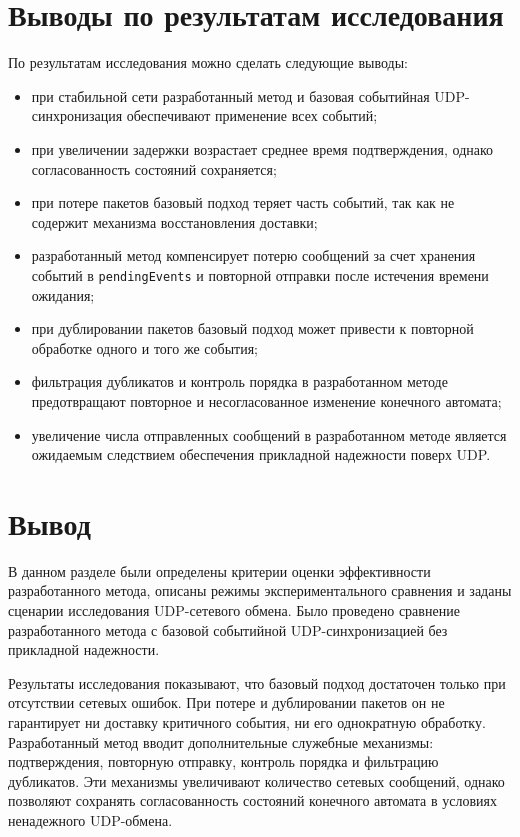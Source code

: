 \section{Выводы по результатам исследования}

По результатам исследования можно сделать следующие выводы:
\begin{itemize}
	\item при стабильной сети разработанный метод и базовая событийная UDP-синхронизация обеспечивают применение всех событий;
	\item при увеличении задержки возрастает среднее время подтверждения, однако согласованность состояний сохраняется;
	\item при потере пакетов базовый подход теряет часть событий, так как не содержит механизма восстановления доставки;
	\item разработанный метод компенсирует потерю сообщений за счет хранения событий в \texttt{pendingEvents} и повторной отправки после истечения времени ожидания;
	\item при дублировании пакетов базовый подход может привести к повторной обработке одного и того же события;
	\item фильтрация дубликатов и контроль порядка в разработанном методе предотвращают повторное и несогласованное изменение конечного автомата;
	\item увеличение числа отправленных сообщений в разработанном методе является ожидаемым следствием обеспечения прикладной надежности поверх UDP.
\end{itemize}

\section*{Вывод}

В данном разделе были определены критерии оценки эффективности разработанного метода, описаны режимы экспериментального сравнения и заданы сценарии исследования UDP-сетевого обмена. Было проведено сравнение разработанного метода с базовой событийной UDP-синхронизацией без прикладной надежности.

Результаты исследования показывают, что базовый подход достаточен только при отсутствии сетевых ошибок. При потере и дублировании пакетов он не гарантирует ни доставку критичного события, ни его однократную обработку. Разработанный метод вводит дополнительные служебные механизмы: подтверждения, повторную отправку, контроль порядка и фильтрацию дубликатов. Эти механизмы увеличивают количество сетевых сообщений, однако позволяют сохранять согласованность состояний конечного автомата в условиях ненадежного UDP-обмена.
